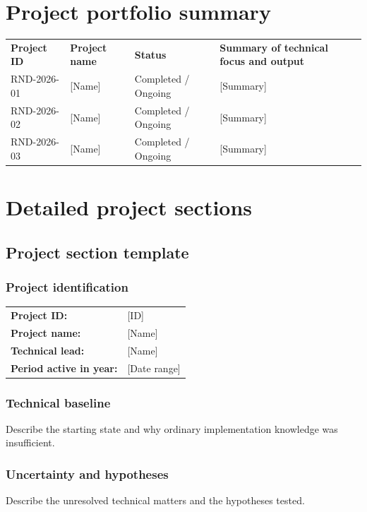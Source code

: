 \documentclass[11pt]{article}
\begin{document}
\section{Project portfolio summary}
\begin{xltabular}{\textwidth}{L{2.2cm}L{4.1cm}L{2.6cm}Y}
\textbf{Project ID} & \textbf{Project name} & \textbf{Status} & \textbf{Summary of technical focus and output} \\
RND-2026-01 & {[Name]} & {Completed / Ongoing} & {[Summary]} \\
RND-2026-02 & {[Name]} & {Completed / Ongoing} & {[Summary]} \\
RND-2026-03 & {[Name]} & {Completed / Ongoing} & {[Summary]} \\
\end{xltabular}

\section{Detailed project sections}
\subsection{Project section template}
\subsubsection{Project identification}
\begin{tabularx}{\textwidth}{@{}L{4.2cm}Y@{}}
\textbf{Project ID:} & {[ID]} \\
\textbf{Project name:} & {[Name]} \\
\textbf{Technical lead:} & {[Name]} \\
\textbf{Period active in year:} & {[Date range]} \\
\end{tabularx}

\subsubsection{Technical baseline}
Describe the starting state and why ordinary implementation knowledge was insufficient.

\subsubsection{Uncertainty and hypotheses}
Describe the unresolved technical matters and the hypotheses tested.
\end{document}
